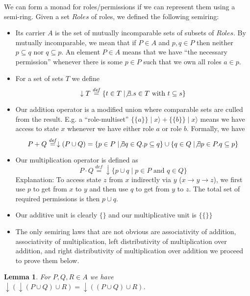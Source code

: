 \documentclass{article}
\newtheorem{lemma}{Lemma}
\newcommand{\defeq}{\overset{\mathit{def}}{=}}
\begin{document}
We can form a monad for roles/permissions if we can represent them using a semi-ring. Given a set $\mathit{Roles}$ of roles, we defined the following semiring:
\begin{itemize}
\item Its carrier $A$ is the set of mutually incomparable sets of subsets of $\mathit{Roles}$. By mutually incomparable, we mean that if $P \in A$ and $p,q \in P$ then neither $p \subseteq q$ nor $q \subseteq p$. 
        An element $P \in A$ means that we have ``the necessary permission'' whenever there is some $p \in P$ such that we own all roles $a \in p$.
\item For a set of sets $T$ we define $$\downarrow T \defeq \{ t \in T \mid \not \exists. s \in T \text{ with } t \subseteq s \}$$ 
\item Our addition operator is a modified union where comparable sets are culled from the result. E.g. a ``role-multiset'' $\{ \{ a \} \} \mid x \rangle + \{ \{ b \} \} \mid x \rangle$ means we have access to state $x$ whenever we have either role $a$ or role $b$. Formally, we have $$P + Q \defeq \downarrow(P \cup Q) = \{ p \in P \mid \not \exists q \in Q. p \subseteq q \} \cup \{ q \in Q \mid \not \exists p \in P. q \subseteq p \}$$
\item Our multiplication operator is defined as $$P \cdot Q \defeq \downarrow \{ p \cup q \mid p \in P \text{ and } q \in Q \}$$ Explanation: To access state $z$ from $x$ indirectly via $y$ ($x \to y \to z$),  we first use $p$ to get from $x$ to $y$ and then use $q$ to get from $y$ to $z$. The total set of required permissions is then $p \cup q$.
\item Our additive unit is clearly $\{ \}$ and our multiplicative unit is $\{ \{ \} \}$
\item The only semiring laws that are not obvious are associativity of addition, associativity of multiplication, left distributivity of multiplication over addition, and right distributivity of multiplication over addition we proceed to prove them below.
\end{itemize}

\begin{lemma}
For $P,Q,R \in A$ we have $\downarrow(\downarrow(P \cup Q) \cup R) = \downarrow((P \cup Q) \cup R)$.
\end{lemma}
\end{document}
